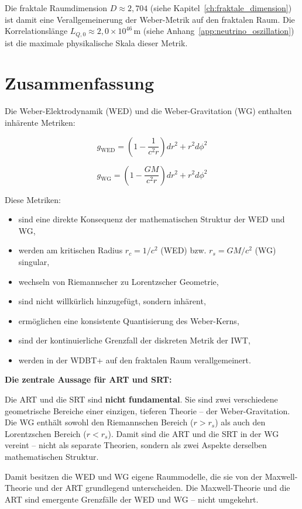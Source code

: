 Die fraktale Raumdimension \( D \approx 2,704 \) (siehe Kapitel~\ref{ch:fraktale_dimension}) ist damit eine Verallgemeinerung der Weber-Metrik auf den fraktalen Raum. Die Korrelationslänge \( L_{Q,0} \approx 2{,}0 \times 10^{46} \, \text{m} \) (siehe Anhang~\ref{app:neutrino_oszillation}) ist die maximale physikalische Skala dieser Metrik.

\section{Zusammenfassung}
\label{app:weber_metrik_zusammenfassung}

Die Weber-Elektrodynamik (WED) und die Weber-Gravitation (WG) enthalten inhärente Metriken:

\[
g_{\text{WED}} = \left(1 - \frac{1}{c^2r}\right) dr^2 + r^2 d\phi^2
\]

\[
g_{\text{WG}} = \left(1 - \frac{GM}{c^2 r}\right) dr^2 + r^2 d\phi^2
\]

Diese Metriken:
\begin{itemize}
    \item sind eine direkte Konsequenz der mathematischen Struktur der WED und WG,
    \item werden am kritischen Radius \( r_c = 1/c^2 \) (WED) bzw. \( r_s = GM/c^2 \) (WG) singular,
    \item wechseln von Riemannscher zu Lorentzscher Geometrie,
    \item sind nicht willkürlich hinzugefügt, sondern inhärent,
    \item ermöglichen eine konsistente Quantisierung des Weber-Kerns,
    \item sind der kontinuierliche Grenzfall der diskreten Metrik der IWT,
    \item werden in der WDBT+ auf den fraktalen Raum verallgemeinert.
\end{itemize}

\textbf{Die zentrale Aussage für ART und SRT:}

Die ART und die SRT sind \textbf{nicht fundamental}. Sie sind zwei verschiedene geometrische Bereiche einer einzigen, tieferen Theorie – der Weber-Gravitation. Die WG enthält sowohl den Riemannschen Bereich (\( r > r_s \)) als auch den Lorentzschen Bereich (\( r < r_s \)). Damit sind die ART und die SRT in der WG vereint – nicht als separate Theorien, sondern als zwei Aspekte derselben mathematischen Struktur.

Damit besitzen die WED und WG eigene Raummodelle, die sie von der Maxwell-Theorie und der ART grundlegend unterscheiden. Die Maxwell-Theorie und die ART sind emergente Grenzfälle der WED und WG – nicht umgekehrt.